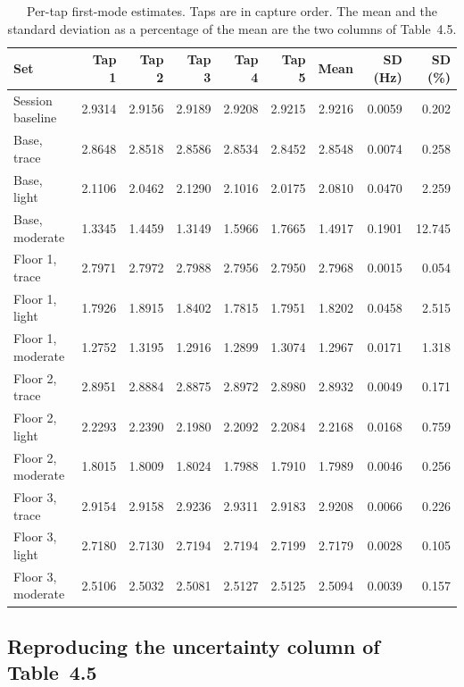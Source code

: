 \begin{table}[htbp]
\centering
\small
\caption{Per-tap first-mode estimates. Taps are in capture order. The mean and
the standard deviation as a percentage of the mean are the two columns of
Table~4.5.}
\label{tab:pertap}
\begin{tabular}{lrrrrrrrr}
\toprule
Set & Tap 1 & Tap 2 & Tap 3 & Tap 4 & Tap 5 & Mean & SD (Hz) & SD (\%) \\
\midrule
Session baseline & 2.9314 & 2.9156 & 2.9189 & 2.9208 & 2.9215 & 2.9216 & 0.0059 & 0.202 \\
\midrule
Base, trace & 2.8648 & 2.8518 & 2.8586 & 2.8534 & 2.8452 & 2.8548 & 0.0074 & 0.258 \\
Base, light & 2.1106 & 2.0462 & 2.1290 & 2.1016 & 2.0175 & 2.0810 & 0.0470 & 2.259 \\
Base, moderate & 1.3345 & 1.4459 & 1.3149 & 1.5966 & 1.7665 & 1.4917 & 0.1901 & 12.745 \\
\midrule
Floor 1, trace & 2.7971 & 2.7972 & 2.7988 & 2.7956 & 2.7950 & 2.7968 & 0.0015 & 0.054 \\
Floor 1, light & 1.7926 & 1.8915 & 1.8402 & 1.7815 & 1.7951 & 1.8202 & 0.0458 & 2.515 \\
Floor 1, moderate & 1.2752 & 1.3195 & 1.2916 & 1.2899 & 1.3074 & 1.2967 & 0.0171 & 1.318 \\
\midrule
Floor 2, trace & 2.8951 & 2.8884 & 2.8875 & 2.8972 & 2.8980 & 2.8932 & 0.0049 & 0.171 \\
Floor 2, light & 2.2293 & 2.2390 & 2.1980 & 2.2092 & 2.2084 & 2.2168 & 0.0168 & 0.759 \\
Floor 2, moderate & 1.8015 & 1.8009 & 1.8024 & 1.7988 & 1.7910 & 1.7989 & 0.0046 & 0.256 \\
\midrule
Floor 3, trace & 2.9154 & 2.9158 & 2.9236 & 2.9311 & 2.9183 & 2.9208 & 0.0066 & 0.226 \\
Floor 3, light & 2.7180 & 2.7130 & 2.7194 & 2.7194 & 2.7199 & 2.7179 & 0.0028 & 0.105 \\
Floor 3, moderate & 2.5106 & 2.5032 & 2.5081 & 2.5127 & 2.5125 & 2.5094 & 0.0039 & 0.157 \\
\bottomrule
\end{tabular}
\end{table}

\subsection*{Reproducing the uncertainty column of Table~4.5}

